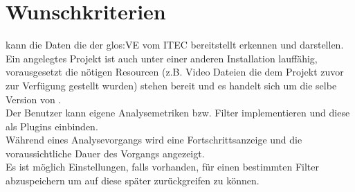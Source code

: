 \section{Wunschkriterien}
\setcounter{counterKriterien}{0}
% 
 \projektTitel kann die Daten die der \gls{glos:VE} vom \gls{ITEC}  bereitstellt erkennen und darstellen.\\
 Ein angelegtes Projekt ist auch unter einer anderen \projektTitel Installation lauffähig, vorausgesetzt die nötigen Resourcen (z.B. Video Dateien die dem Projekt zuvor zur Verfügung gestellt wurden)  stehen bereit und es handelt sich um die selbe Version von \projektTitel.\\
 Der Benutzer kann eigene Analysemetriken bzw. Filter implementieren und diese als Plugins einbinden.\\
 Während eines Analysevorgangs wird eine Fortschrittsanzeige und die voraussichtliche Dauer des Vorgangs angezeigt.\\
 Es ist möglich Einstellungen, falls vorhanden, für einen bestimmten Filter abzuspeichern um auf diese später zurückgreifen zu können.\\
